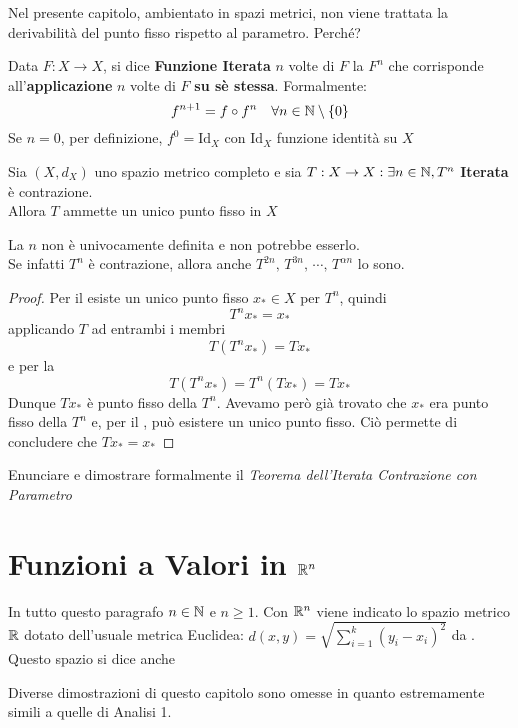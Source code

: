 \begin{exercise}
	Nel presente capitolo, ambientato in spazi metrici, non viene trattata la derivabilità del punto fisso rispetto al parametro. Perché?
\end{exercise}

\begin{definition}
	\label{def:iterata}
	Data $F:X \to X$, si dice \textbf{Funzione Iterata} $n$ volte di $F$ la $F^n$ che corrisponde all'\textbf{applicazione} $n$ volte di $F$ \textbf{su sè stessa}. Formalmente:
	\[f^{n+1} = f \circ f^n \quad \forall n \in \mathbb{N}\setminus\left\{0\right\}\]
	Se $n = 0$, per definizione, $f^0 = \mathrm{Id}_X$ con $\mathrm{Id}_X$ funzione identità su $X$
\end{definition}

\begin{theorem}
	\label{teo:iterata_contraz}
	Sia $(X,d_X)$ uno spazio metrico completo e sia $T:X \to X : \exists n \in \mathbb{N}, T^n$ \textbf{Iterata} è contrazione.\\
	Allora $T$ ammette un unico punto fisso in $X$
	\begin{note}
		La $n$ non è univocamente definita e non potrebbe esserlo.\\
		Se infatti $T^n$ è contrazione, allora anche $T^{2n},\, T^{3n},\, \cdots,\, T^{\alpha n}$ lo sono.
	\end{note}
	\begin{proof}
		Per il  esiste un unico punto fisso $x_* \in X$ per $T^n$, quindi
		\[T^nx_* = x_*\]
		applicando $T$ ad entrambi i membri
		\[T(T^{n}x_*) = Tx_*\]
		e per la 
		\[T(T^{n}x_*) = T^n(Tx_*) = Tx_*\]
		Dunque $Tx_*$ è punto fisso della $T^n$. Avevamo però già trovato che $x_*$ era punto fisso della $T^n$ e, per il , può esistere un unico punto fisso. Ciò permette di concludere che $Tx_* = x_*$
	\end{proof}
\end{theorem}
\begin{exercise}
	Enunciare e dimostrare formalmente il \textit{Teorema dell'Iterata Contrazione con Parametro}
\end{exercise}
\cbend

\newpage
\section{Funzioni a Valori in \texorpdfstring{$\protect \mathbb{R}^n$}{Rn}}
In tutto questo paragrafo $n \in \mathbb{N}$ e $n \geq 1$.  Con $\mathbb{R}^n$ viene indicato lo spazio metrico $\mathbb{R}$ dotato dell'usuale metrica Euclidea: $d(x,y) = \sqrt{\sum\limits_{i = 1}^{k} (y_i - x_i)^2}$ da . Questo spazio si dice anche 
\begin{note}
	Diverse dimostrazioni di questo capitolo sono omesse in quanto estremamente simili a quelle di Analisi 1.
\end{note}

